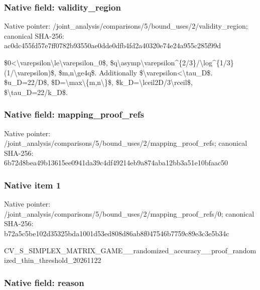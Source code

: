 \documentclass[10pt,a4paper]{article}
\begin{document}
\subsubsection{Native field: validity\_region}


Native pointer: /joint\_analysis/comparis\allowbreak{}ons/5/bound\_uses/2/valid\allowbreak{}ity\_region; canonical SHA-256: ac0dc455fd57e7ff0782b935\allowbreak{}50ae0dde0dfb4fd2a40320e7\allowbreak{}4e24a955c285f99d


\$0<\textbackslash{}varepsilon\textbackslash{}le\textbackslash{}varepsilon\_0\$, \$q\textbackslash{}asymp\textbackslash{}varepsilon\textasciicircum{}\{2/\allowbreak{}3\}/\textbackslash{}log\textasciicircum{}\{1/3\}(1/\textbackslash{}varepsi\allowbreak{}lon)\$, \$m,n\textbackslash{}ge4q\$. Additionally \$\textbackslash{}varepsilon<\textbackslash{}tau\_D\$. \$u\_D=22/D\$, \$D=\textbackslash{}max\textbackslash{}\{m,n\textbackslash{}\}\$, \$k\_D=\textbackslash{}lceil2D/3\textbackslash{}rceil\$, \$\textbackslash{}tau\_D=22/k\_D\$.


\subsubsection{Native field: mapping\_proof\_refs}


Native pointer: /joint\_analysis/comparis\allowbreak{}ons/5/bound\_uses/2/mappi\allowbreak{}ng\_proof\_refs; canonical SHA-256: 6b72d8bea49b13615ee0941d\allowbreak{}a39c4df49214eb9a874aba12\allowbreak{}bb3a51e10bfaac50



\subsubsection{Native item 1}


Native pointer: /joint\_analysis/comparis\allowbreak{}ons/5/bound\_uses/2/mappi\allowbreak{}ng\_proof\_refs/0; canonical SHA-256: b72a5c5be102d35325bda100\allowbreak{}1d53ed808d86ab8f047546b7\allowbreak{}759c89e3c3e5b34c


CV\_S\_SIMPLEX\_MATRIX\_GAME\allowbreak{}\_\_randomized\_accuracy\_\_p\allowbreak{}roof\_randomized\_thin\_thr\allowbreak{}eshold\_20261122


\subsubsection{Native field: reason}
\end{document}
